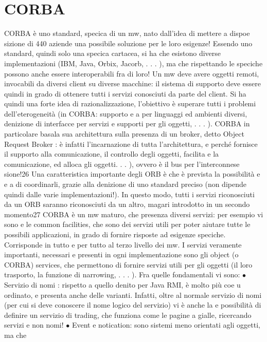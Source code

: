 \documentclass[a4paper,12pt]{article}
\begin{document}
\section{CORBA}
CORBA è uno standard, specica di un mw, nato dall'idea di mettere a dispoe
sizione di 440 aziende una possibile soluzione per le loro esigenze!
Essendo uno standard, quindi solo una specica cartacea, si ha che esistono
diverse implementazioni (IBM, Java, Orbix, Jacorb, . . . ), ma che rispettando le
speciche possono anche essere interoperabili fra di loro!
Un mw deve avere oggetti remoti, invocabili da diversi client su diverse macchine: il sistema di supporto deve essere
quindi in grado di ottenere tutti i servizi
conosciuti da parte del client. Si ha quindi una forte idea di razionalizzazione,
l'obiettivo è superare tutti i problemi dell'eterogeneità (in CORBA: supporto
e
a
per linguaggi ed ambienti diversi, denizione di interfacce per servizi e supporti
per gli oggetti, . . . ).
CORBA in particolare basala sua architettura sulla presenza di un broker,
detto Object Request Broker : è infatti l'incarnazione di tutta l'architettura,
e
perché fornisce il supporto alla comunicazione, il controllo degli oggetti, facilita
e
la comunicazione, ed alloca gli oggetti. . . ), ovvero è il bus per l'interconnese
sione!26 Una caratteristica importante degli ORB è che è prevista la possibilità
e
e
a
di coordinarli, grazie alla denizione di uno standard preciso (non dipende quindi dalle varie implementazioni!). In
questo modo, tutti i servizi riconosciuti da
un ORB saranno riconosciuti da un altro, magari introdotto in un secondo
momento27
CORBA è un mw maturo, che presenza diversi servizi: per esempio vi sono
e
le common facilities, che sono dei servizi utili per poter aiutare tutte le possibili
applicazioni, in grado di fornire risposte ad esigenze speciche. Corrisponde in
tutto e per tutto al terzo livello dei mw.
I servizi veramente importanti, necessari e presenti in ogni implementazione
sono gli object (o CORBA) services, che permettono di fornire servizi utili per gli
oggetti (il loro trasporto, la funzione di narrowing, . . . ). Fra quelle fondamentali
vi sono:
$\bullet$ Servizio di nomi : rispetto a quello denito per Java RMI, è molto più coe
u
ordinato, e presenta anche delle varianti. Infatti, oltre al normale servizio
di nomi (per cui si deve conoscere il nome logico del servizio) vi è anche la
e
possibilità di definire un servizio di trading, che funziona come le pagine
a
gialle, ricercando servizi e non nomi!
$\bullet$ Event e notication: sono sistemi meno orientati agli oggetti, ma che
\end{document}

